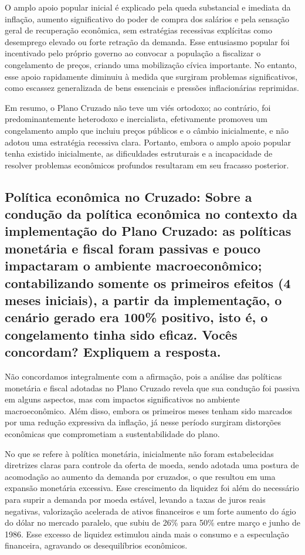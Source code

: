 \documentclass[a4paper,12pt]{article}[abntex2]
\begin{document}
O amplo apoio popular inicial é explicado pela queda substancial e imediata da inflação, aumento significativo do poder de compra dos salários e pela sensação geral de recuperação econômica, sem estratégias recessivas explícitas como desemprego elevado ou forte retração da demanda. Esse entusiasmo popular foi incentivado pelo próprio governo ao convocar a população a fiscalizar o congelamento de preços, criando uma mobilização cívica importante. No entanto, esse apoio rapidamente diminuiu à medida que surgiram problemas significativos, como escassez generalizada de bens essenciais e pressões inflacionárias reprimidas.

Em resumo, o Plano Cruzado não teve um viés ortodoxo; ao contrário, foi predominantemente heterodoxo e inercialista, efetivamente promoveu um congelamento amplo que incluiu preços públicos e o câmbio inicialmente, e não adotou uma estratégia recessiva clara. Portanto, embora o amplo apoio popular tenha existido inicialmente, as dificuldades estruturais e a incapacidade de resolver problemas econômicos profundos resultaram em seu fracasso posterior.

\subsection{\textbf{Política econômica no Cruzado: Sobre a condução da política econômica no contexto da implementação do Plano Cruzado: as políticas monetária e fiscal foram passivas e pouco impactaram o ambiente macroeconômico; contabilizando somente os primeiros efeitos (4 meses iniciais), a partir da implementação, o cenário gerado era 100\% positivo, isto é, o congelamento tinha sido eficaz. Vocês concordam? Expliquem a resposta.}}

Não concordamos integralmente com a afirmação, pois a análise das políticas monetária e fiscal adotadas no Plano Cruzado revela que sua condução foi passiva em alguns aspectos, mas com impactos significativos no ambiente macroeconômico. Além disso, embora os primeiros meses tenham sido marcados por uma redução expressiva da inflação, já nesse período surgiram distorções econômicas que comprometiam a sustentabilidade do plano.

No que se refere à política monetária, inicialmente não foram estabelecidas diretrizes claras para controle da oferta de moeda, sendo adotada uma postura de acomodação ao aumento da demanda por cruzados, o que resultou em uma expansão monetária excessiva. Esse crescimento da liquidez foi além do necessário para suprir a demanda por moeda estável, levando a taxas de juros reais negativas, valorização acelerada de ativos financeiros e um forte aumento do ágio do dólar no mercado paralelo, que subiu de 26\% para 50\% entre março e junho de 1986. Esse excesso de liquidez estimulou ainda mais o consumo e a especulação financeira, agravando os desequilíbrios econômicos.
\end{document}
